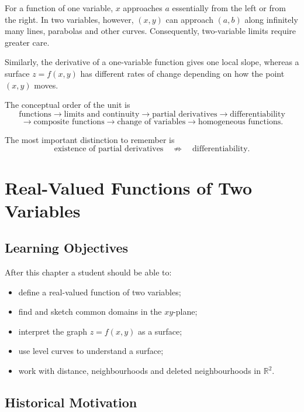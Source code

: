 \documentclass[11pt,oneside]{book}
\theoremstyle{studentthm}
\theoremstyle{definition}
\newcommand{\R}{\mathbb{R}}
\begin{document}
For a function of one variable, \(x\) approaches \(a\) essentially
from the left or from the right. In two variables, however,
\((x,y)\) can approach \((a,b)\) along infinitely many lines,
parabolas and other curves. Consequently, two-variable limits require
greater care.

Similarly, the derivative of a one-variable function gives one local
slope, whereas a surface \(z=f(x,y)\) has different rates of change
depending on how the point \((x,y)\) moves.

The conceptual order of the unit is
\[
\text{functions}
\longrightarrow
\text{limits and continuity}
\longrightarrow
\text{partial derivatives}
\longrightarrow
\text{differentiability}
\]
\[
\longrightarrow
\text{composite functions}
\longrightarrow
\text{change of variables}
\longrightarrow
\text{homogeneous functions}.
\]

The most important distinction to remember is
\[
\text{existence of partial derivatives}
\quad\not\Rightarrow\quad
\text{differentiability}.
\]

\mainmatter

\chapter{Real-Valued Functions of Two Variables}

\section*{Learning Objectives}

After this chapter a student should be able to:
\begin{itemize}
\item define a real-valued function of two variables;
\item find and sketch common domains in the \(xy\)-plane;
\item interpret the graph \(z=f(x,y)\) as a surface;
\item use level curves to understand a surface;
\item work with distance, neighbourhoods and deleted neighbourhoods
in \(\R^2\).
\end{itemize}

\section*{Historical Motivation}
\end{document}
